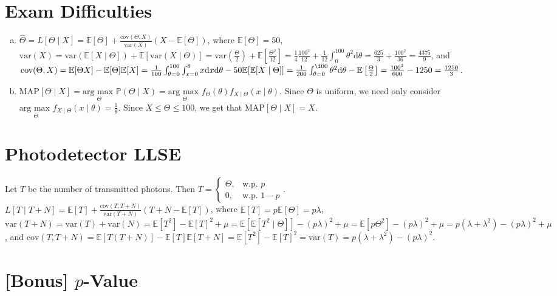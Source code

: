 \documentclass[11pt]{article}
\begin{document}
\section{Exam Difficulties}
\begin{enumerate}[(a)]
    \item $\hat{\Theta} = L[\Theta \mid X] = \mathbb{E}[\Theta] +
        \frac{\text{cov}(\Theta, X)}{\text{var}(X)} (X - \mathbb{E}[\Theta])$,
        where $\mathbb{E}[\Theta] = 50$, $\text{var}(X) =
        \text{var}(\mathbb{E}[X \mid \Theta]) + \mathbb{E}[\text{var}(X \mid
        \Theta)] = \text{var}\left(\frac{\Theta}{2}\right) +
        \mathbb{E}\left[\frac{\Theta^{2}}{12}\right] = \frac{1}{4}
        \frac{100^{2}}{12} + \frac{1}{12} \int_{0}^{100} \theta^{2}
        \mathrm{d}\theta = \frac{625}{3} + \frac{100^{2}}{36} = \frac{4375}{9}$, and $\text{cov}(\Theta, X) = \mathbb{E}[\Theta
        X] - \mathbb{E}[\Theta] \mathbb{E}[X] = \frac{1}{100} \int_{\theta =
        0}^{100}
        \int_{x = 0}^{\theta} x \mathrm{d}x \mathrm{d}\theta -
        50 \mathbb{E}[\mathbb{E}[X \mid \Theta]] = \frac{1}{200} \int_{\theta =
        0}^{\100} \theta^{2} \mathrm{d}\theta -
          \mathbb{E}\left[\frac{\Theta}{2}\right] =
          \frac{100^{3}}{600} - 1250 = \frac{1250}{3}$.

      \item $\text{MAP}[\Theta \mid X] = \underset{\Theta}{\text{arg max }}
          \mathbb{P}(\Theta \mid X) = \underset{\Theta}{\text{arg max }}
          f_{\Theta}(\theta) f_{X \mid \Theta}(x \mid \theta)$. Since $\Theta$
          is uniform, we need only consider $\underset{\Theta}{\text{arg max
          }} f_{X \mid \Theta}(x \mid \theta) = \frac{1}{\theta}$. Since $X
          \leq \Theta \leq 100$, we get that $\text{MAP}[\Theta \mid X] = X$.
\end{enumerate}

\section{Photodetector LLSE}
Let $T$ be the number of transmitted photons. Then $T =
\begin{cases}
    \Theta, & \text{w.p. } p
    \\
    0, & \text{w.p. } 1 - p
\end{cases}$. \\
$L[T \mid T + N] = \mathbb{E}[T] + \frac{\text{cov}(T, T + N)}{\text{var}(T +
N)}(T + N - \mathbb{E}[T])$, where $\mathbb{E}[T] = p \mathbb{E}[\Theta] =
p\lambda$, $\text{var}(T + N) = \text{var}(T) + \text{var}(N) =
\mathbb{E}[T^{2}] - \mathbb{E}[T]^{2} + \mu = \mathbb{E}[\mathbb{E}[T^{2} \mid
\Theta]] - (p \lambda)^{2} + \mu = \mathbb{E}[p\Theta^{2}] - (p \lambda)^{2} +
\mu = p(\lambda + \lambda^{2}) - (p \lambda)^{2} + \mu$, and $\text{cov}(T, T +
N) = \mathbb{E}[T(T + N)] - \mathbb{E}[T]\mathbb{E}[T + N] = \mathbb{E}[T^{2}]
- \mathbb{E}[T]^{2} = \text{var}(T) = p(\lambda + \lambda^{2}) - (p
\lambda)^{2}$.

\section{[Bonus] $p$-Value}

\clearpage
\end{document}
